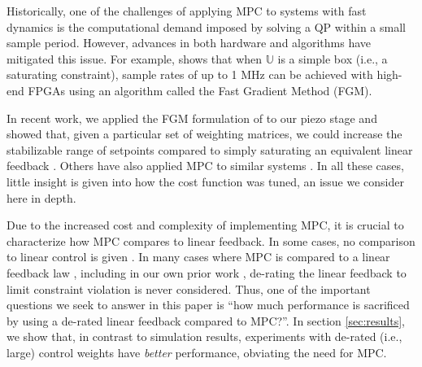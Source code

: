\documentclass[twocolumn,twoside]{IEEEtran}
\begin{document}
Historically, one of the challenges of applying MPC to systems with fast dynamics is the computational demand imposed by solving a QP within a small sample period. However, advances in both hardware and algorithms have mitigated this issue. For example, \cite{Jerez_Trans_2014} shows that when $\mathds{U}$ is a simple box (i.e., a saturating constraint), sample rates of up to 1 MHz can be achieved with high-end FPGAs using an algorithm called the Fast Gradient Method (FGM). 


In recent work, we applied the FGM formulation of \cite{Jerez_Trans_2014} to our piezo stage and showed that, given a particular set of weighting matrices, we could increase the stabilizable range of setpoints compared to simply saturating an equivalent linear feedback \cite{braker_application_2017}. Others have also applied MPC to similar systems \cite{Wills_CDC_2005, Lin_ASME_2012, rana_spiral_2014, rana_MPC}. In all these cases, little insight is given into how the cost function was tuned, an issue we consider here in depth.

Due to the increased cost and complexity of implementing MPC, it is crucial to characterize how MPC compares to linear feedback. In some cases, no comparison to linear control is given \cite{rana_spiral_2014, rana_MPC}. 
In many cases where MPC is compared to a linear feedback law \cite{Wills_CDC_2005, Lin_ASME_2012}, including in our own prior work \cite{braker_application_2017}, de-rating the linear feedback to limit constraint violation is never considered. Thus, one of the important questions we seek to answer in this paper is ``how much performance is sacrificed by using a de-rated linear feedback compared to MPC?''. In section \ref{sec:results}, we show that, in contrast to simulation results, experiments with de-rated (i.e., large) control weights have \emph{better} performance, obviating the need for MPC. 
\end{document}
